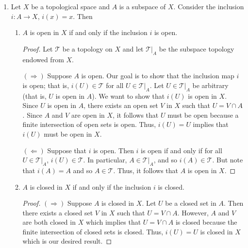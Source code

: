 \documentclass[a4paper]{article}
\begin{document}
\begin{problem}
   \begin{enumerate}
       \item[(i)] Let \( X  \) be a topological space and \( A  \) is a subspace of \( X  \). Consider the inclusion \( i : A \to X  \), \( i(x) = x  \). Then
           \begin{enumerate}
               \item[(a)] \( A  \) is open in \( X \) if and only if the inclusion \( i \) is open.
                   \begin{proof}
                       Let \( \mathcal{T} \) be a topology on \( X  \) and let \( \mathcal{T} |_{A} \) be the subspace topology endowed from \( X  \). 
                      
                       \( (\Longrightarrow) \) Suppose \( A  \) is open. Our goal is to show that the inclusion map \( i  \) is open; that is, \( i(U) \in \mathcal{T} \) for all \( U \in \mathcal{T} |_{A}  \). Let \( U \in \mathcal{T} |_{A} \) be arbitrary (that is, \( U  \) is open in \( A  \)). We want to show that \( i(U)  \) is open in \( X  \). Since \( U \) is open in \( A  \), there exists an open set \( V  \) in \( X  \) such that \( U = V \cap A  \). Since \( A  \) and \( V \) are open in \( X  \), it follows that \( U  \) must be open because a finite intersection of open sets is open. Thus, \( i(U) = U  \) implies that \( i(U) \) must be open in \( X  \). 

                       \( (\Longleftarrow) \) Suppose that \( i  \) is open. Then \( i \) is open if and only if for all \( U \in \mathcal{T} |_{A}  \), \( i(U) \in \mathcal{T} \). In particular, \( A \in \mathcal{T} |_{A} \), and so \( i(A) \in \mathcal{T} \). But note that \( i(A) = A  \) and so \( A \in \mathcal{T} \). Thus, it follows that \( A  \) is open in \( X  \).                    
                   \end{proof}
                \item[(b)] \( A  \) is closed in \( X  \) if and only if the inclusion \( i \) is closed.
                    \begin{proof}
                        \( (\Longrightarrow) \) Suppose \( A  \) is closed in \( X  \). Let \( U  \) be a closed set in \( A  \). Then there exists a closed set \( V  \) in \( X  \) such that \( U = V \cap A  \). However, \( A \) and \( V  \) are both closed in \( X  \) which implies that \( U = V \cap A   \) is closed because the finite intersection of closed sets is closed. Thus, \( i(U) =  U \) is closed in \( X  \) which is our desired result.                         


\end{proof}
\end{enumerate}
\end{enumerate}
\end{problem}
\end{document}
